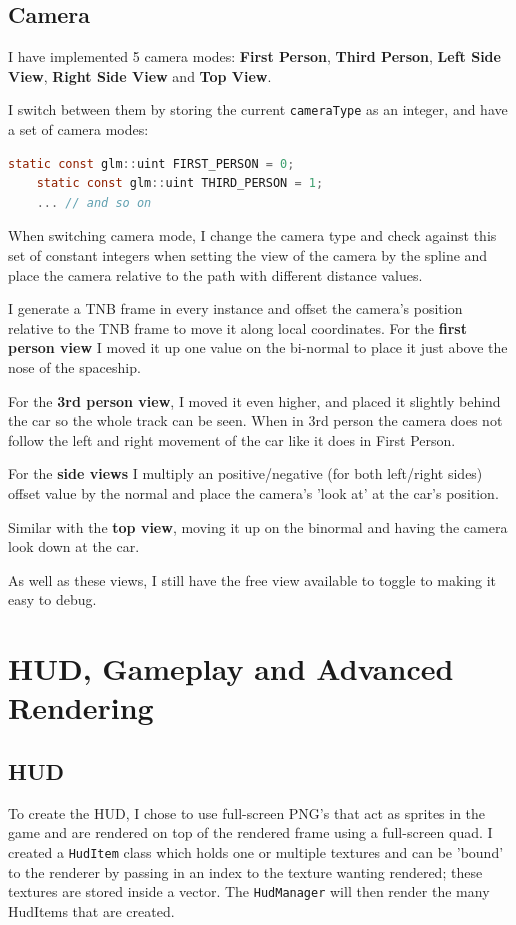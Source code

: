 \documentclass[10pt]{report}
\begin{document}
\subsection*{Camera}
I have implemented 5 camera modes: \textbf{First Person}, \textbf{Third Person}, \textbf{Left Side View}, \textbf{Right Side View} and \textbf{Top View}.

I switch between them by storing the current \colorbox{mygrey}{\lstinline{cameraType}} as an integer, and have a set of camera modes:
\begin{lstlisting}[language=c]
    static const glm::uint FIRST_PERSON = 0;
    static const glm::uint THIRD_PERSON = 1;
    ... // and so on
\end{lstlisting}
When switching camera mode, I change the camera type and check against this set of constant integers when setting the view of the camera by the spline and place the camera relative to the path with different distance values.

I generate a TNB frame in every instance and offset the camera's position relative to the TNB frame to move it along local coordinates. For the \textbf{first person view} I moved it up one value on the bi-normal to place it just above the nose of the spaceship.

For the \textbf{3rd person view}, I moved it even higher, and placed it slightly behind the car so the whole track can be seen. When in 3rd person the camera does not follow the left and right movement of the car like it does in First Person.

For the \textbf{side views} I multiply an positive/negative (for both left/right sides) offset value by the normal and place the camera's 'look at' at the car's position.

Similar with the \textbf{top view}, moving it up on the binormal and having the camera look down at the car.

As well as these views, I still have the free view available to toggle to making it easy to debug.

\section*{HUD, Gameplay and Advanced Rendering}
\subsection*{HUD}
To create the HUD, I chose to use full-screen PNG's that act as sprites in the game and are rendered on top of the rendered frame using a full-screen quad. I created a \colorbox{mygrey}{\lstinline{HudItem}} class which holds one or multiple textures and can be 'bound' to the renderer by passing in an index to the texture wanting rendered; these textures are stored inside a vector. The \colorbox{mygrey}{\lstinline{HudManager}} will then render the many HudItems that are created.
\end{document}
